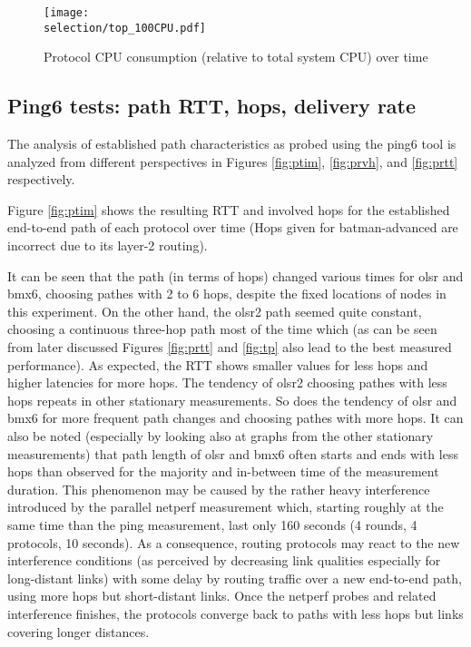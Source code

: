 \documentclass[a4paper,12pt,twoside]{article}
\begin{document}
\begin{figure}[!ht]
\centering
\texttt{[image: \\selection/top\_100CPU.pdf]}
\caption{Protocol CPU consumption (relative to total system CPU) over time}
\label{fig:cpu}
\end{figure}


\subsection{Ping6 tests: path RTT, hops, delivery rate}


The analysis of established path characteristics as probed using the
ping6 tool is analyzed from different perspectives in Figures
\ref{fig:ptim}, \ref{fig:prvh}, and \ref{fig:prtt} respectively. 

Figure \ref{fig:ptim} shows the resulting RTT and involved hops for
the established end-to-end path of each protocol over time (Hops given
for batman-advanced are incorrect due to its layer-2 routing).

It can be seen that the path (in terms of hops) changed various times
for olsr and bmx6, choosing pathes with 2 to 6 hops, despite the fixed
locations of nodes in this experiment. On the other hand, the olsr2
path seemed quite constant, choosing a continuous three-hop path most
of the time which (as can be seen from later discussed Figures
\ref{fig:prtt} and \ref{fig:tp} also lead to the best measured
performance). As expected, the RTT shows smaller values for less hops
and higher latencies for more hops. The tendency of olsr2 choosing
pathes with less hops repeats in other stationary measurements. So
does the tendency of olsr and bmx6 for more frequent path changes and
choosing pathes with more hops. It can also be noted (especially by
looking also at graphs from the other stationary measurements) that
path length of olsr and bmx6 often starts and ends with less hops than
observed for the majority and in-between time of the measurement
duration.  This phenomenon may be caused by the rather heavy
interference introduced by the parallel netperf measurement which,
starting roughly at the same time than the ping measurement, last only
160 seconds (4 rounds, 4 protocols, 10 seconds). As a consequence,
routing protocols may react to the new interference conditions (as
perceived by decreasing link qualities especially for long-distant
links) with some delay by routing traffic over a new end-to-end path,
using more hops but short-distant links.  Once the netperf probes and
related interference finishes, the protocols converge back to paths
with less hops but links covering longer distances.
\end{document}
